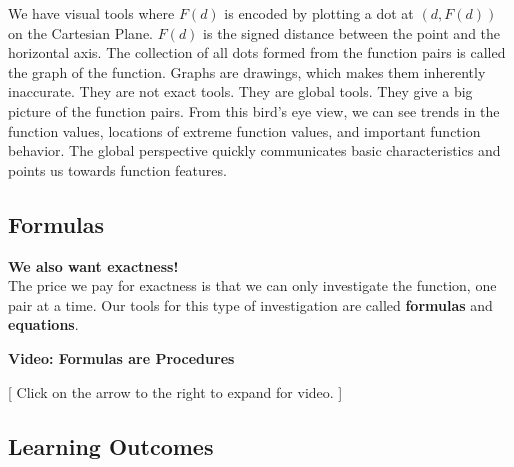 \documentclass{ximera}
\begin{document}
We have visual tools where $F(d)$ is encoded by plotting a dot at $(d, F(d))$ on the Cartesian Plane.  $F(d)$ is the signed distance between the point and the horizontal axis. The collection of all dots formed from the function pairs is called the graph of the function. Graphs are drawings, which makes them inherently inaccurate.  They are not exact tools.  They are global tools.  They give a big picture of the function pairs.  From this bird's eye view, we can see trends in the function values, locations of extreme function values, and important function behavior. The global perspective quickly communicates basic characteristics and points us towards function features.












\subsection*{Formulas}
\textbf{\textcolor{red!70!black}{We also want exactness!}} \\


The price we pay for exactness is that we can only investigate the function, one pair at a time.  Our tools for this type of investigation are called \textbf{formulas} and \textbf{equations}.








\begin{explanation} \textbf{\textcolor{red!75!green}{Video: Formulas are Procedures}}

[ Click on the arrow to the right to expand for video. ]
\begin{expandable} 

\begin{center}
\end{center}

\end{expandable}
\end{explanation}






\subsection*{Learning Outcomes}
\end{document}
